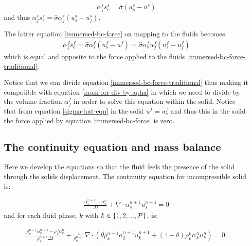 \begin{eqnarray}
\alpha_f^s s_c^s=\hat \sigma (u_s^s -u^s)
\label{immersed-bc-force}
\end{eqnarray}
and thus 
$ \alpha_f^s s_c^s=\hat \sigma \alpha_f^s(u_s^s -u^s_f)$.

The latter equation \ref{immersed-bc-force} on mapping to the fluids becomes:
\begin{eqnarray}
\alpha_f^f s_c^f=\hat \sigma \alpha_s^f (u_s^f -u^f)
=\hat\sigma \alpha_s^f \alpha_f^f(u_s^f -u^f_f)
\end{eqnarray} which 
is equal and opposite to the force applied to the fluids \ref{immersed-bc-force-traditional}. 

Notice that we can divide equation \ref{immersed-bc-force-traditional} 
thus making it compatible with equation \ref{mom-for-div-by-apha} in which we need to 
divide by the volume fraction $\alpha_f^f$ in order to solve this equation 
within the solid. 
Notice that from equation \ref{sigma-hat-eqn} in the solid $u^f=u^f_s$ and thus this 
in the solid the force applied by equation \ref{immersed-bc-force} is zero. 


\subsection{The continuity equation and mass balance} 

Here we develop the equations so that the fluid feels the presence of the solid through 
the solids displacement. 
The continuity equation for incompressible solid is: 

\begin{eqnarray}
\frac{ \alpha_s^{n+1} -\alpha_s^n}{\Delta t} + \nabla\cdot \alpha_s^{n+1} u_s^{n+1} =0
\label{solid-cty-excat}
\end{eqnarray} 
and for each fluid phase, $k$ with $ k\in\{1,2,...,{\cal P}\}$, is: 


\begin{eqnarray}
\frac{ \rho_k^{n+1} \alpha_k^{n+1} -\rho_k^{n}\alpha_k^n}{ \rho_k^{n+1}\Delta t} 
+ \frac{1}{\rho_k^{n+1} } \nabla\cdot (\theta \rho_k^{n+1} \alpha_k^{n+1} u_k^{n+1}+(1-\theta) \rho_k^{n} \alpha_k^{n} u_k^{n}) =0. 
\end{eqnarray} 

